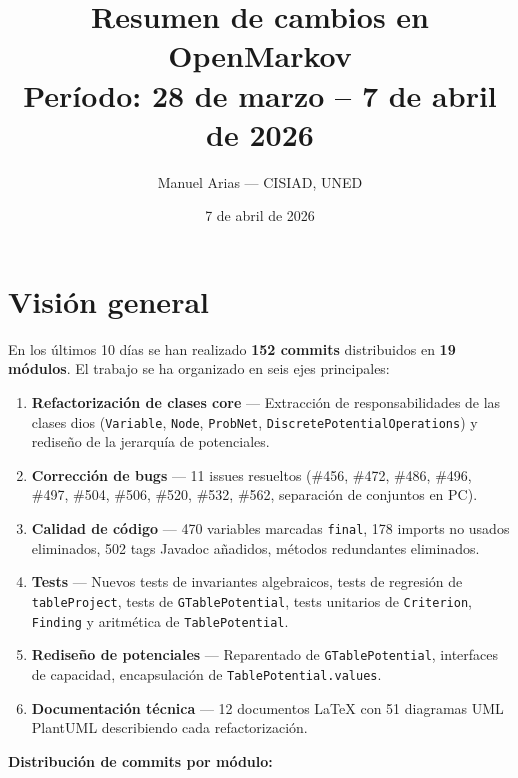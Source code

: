 \documentclass[11pt,a4paper]{article}
\title{\textbf{Resumen de cambios en OpenMarkov}\\[0.3em]
\large Período: 28 de marzo -- 7 de abril de 2026}
\author{Manuel Arias --- CISIAD, UNED}
\date{7 de abril de 2026}
\begin{document}
\maketitle
\tableofcontents
\newpage

\section{Visión general}

En los últimos 10 días se han realizado \textbf{152 commits} distribuidos en \textbf{19 módulos}.
El trabajo se ha organizado en seis ejes principales:

\begin{enumerate}[leftmargin=2cm,label=\textbf{Eje \arabic*:}]
  \item \textbf{Refactorización de clases core} --- Extracción de responsabilidades de las clases dios (\texttt{Variable}, \texttt{Node}, \texttt{ProbNet}, \texttt{DiscretePotentialOperations}) y rediseño de la jerarquía de potenciales.
  \item \textbf{Corrección de bugs} --- 11 issues resueltos (\#456, \#472, \#486, \#496, \#497, \#504, \#506, \#520, \#532, \#562, separación de conjuntos en PC).
  \item \textbf{Calidad de código} --- 470 variables marcadas \texttt{final}, 178 imports no usados eliminados, 502 tags Javadoc añadidos, métodos redundantes eliminados.
  \item \textbf{Tests} --- Nuevos tests de invariantes algebraicos, tests de regresión de \texttt{tableProject}, tests de \texttt{GTablePotential}, tests unitarios de \texttt{Criterion}, \texttt{Finding} y aritmética de \texttt{TablePotential}.
  \item \textbf{Rediseño de potenciales} --- Reparentado de \texttt{GTablePotential}, interfaces de capacidad, encapsulación de \texttt{TablePotential.values}.
  \item \textbf{Documentación técnica} --- 12 documentos LaTeX con 51 diagramas UML PlantUML describiendo cada refactorización.
\end{enumerate}

\bigskip
\noindent\textbf{Distribución de commits por módulo:}
\end{document}

